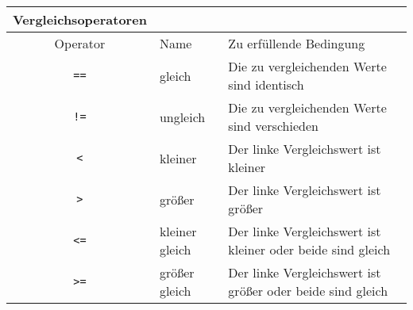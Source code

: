 \documentclass[
convert={outext=.svg, command=\unexpanded{pdf2svg \infile\space\outfile}},
multi=false
]{standalone}
\begin{document}
			\begin{tabular}{cll} 
			\toprule
			Vergleichsoperatoren \\  
			\midrule 
			Operator & Name & Zu erfüllende Bedingung\\ 
			\midrule 
			\texttt{==} & gleich & Die zu vergleichenden Werte sind identisch \\
			\texttt{!=} & ungleich &  Die zu vergleichenden Werte sind verschieden \\
			\texttt{<} & kleiner & Der linke Vergleichswert ist kleiner\\
			\texttt{>} & größer & Der linke Vergleichswert ist größer\\ 
			\texttt{<=} & kleiner gleich & Der linke Vergleichswert ist kleiner oder beide sind gleich\\ 
			\texttt{>=} & größer gleich & Der linke Vergleichswert ist größer oder beide sind gleich\\ 
			\bottomrule
	\end{tabular}
\end{document}
